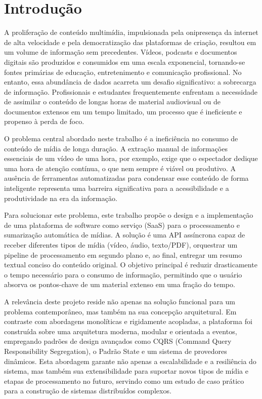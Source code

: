 \section{Introdução}
\label{sec:introducao}

A proliferação de conteúdo multimídia, impulsionada pela onipresença da internet de alta velocidade e pela democratização das plataformas de criação, resultou em um volume de informação sem precedentes. Vídeos, podcasts e documentos digitais são produzidos e consumidos em uma escala exponencial, tornando-se fontes primárias de educação, entretenimento e comunicação profissional. No entanto, essa abundância de dados acarreta um desafio significativo: a sobrecarga de informação. Profissionais e estudantes frequentemente enfrentam a necessidade de assimilar o conteúdo de longas horas de material audiovisual ou de documentos extensos em um tempo limitado, um processo que é ineficiente e propenso à perda de foco.

O problema central abordado neste trabalho é a ineficiência no consumo de conteúdo de mídia de longa duração. A extração manual de informações essenciais de um vídeo de uma hora, por exemplo, exige que o espectador dedique uma hora de atenção contínua, o que nem sempre é viável ou produtivo. A ausência de ferramentas automatizadas para condensar esse conteúdo de forma inteligente representa uma barreira significativa para a acessibilidade e a produtividade na era da informação.

Para solucionar este problema, este trabalho propõe o design e a implementação de uma plataforma de software como serviço (SaaS) para o processamento e sumarização automática de mídias. A solução é uma API assíncrona capaz de receber diferentes tipos de mídia (vídeo, áudio, texto/PDF), orquestrar um pipeline de processamento em segundo plano e, ao final, entregar um resumo textual conciso do conteúdo original. O objetivo principal é reduzir drasticamente o tempo necessário para o consumo de informação, permitindo que o usuário absorva os pontos-chave de um material extenso em uma fração do tempo.

A relevância deste projeto reside não apenas na solução funcional para um problema contemporâneo, mas também na sua concepção arquitetural. Em contraste com abordagens monolíticas e rigidamente acopladas, a plataforma foi construída sobre uma arquitetura moderna, modular e orientada a eventos, empregando padrões de design avançados como CQRS (Command Query Responsibility Segregation), o Padrão State e um sistema de provedores dinâmicos. Esta abordagem garante não apenas a escalabilidade e a resiliência do sistema, mas também sua extensibilidade para suportar novos tipos de mídia e etapas de processamento no futuro, servindo como um estudo de caso prático para a construção de sistemas distribuídos complexos.

